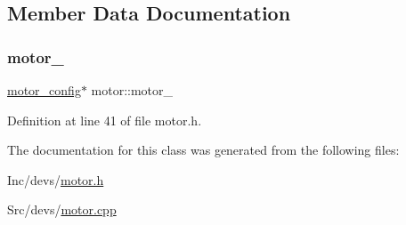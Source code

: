 \subsection{Member Data Documentation}
\mbox{\label{classmotor_ab02539b935506b27e47fe9ae15213ea7}} 
\subsubsection{\texorpdfstring{motor\_}{motor\_}}
{\footnotesize\ttfamily \mbox{\hyperlink{structmotor__config}{motor\+\_\+config}}$\ast$ motor\+::motor\+\_\+\hspace{0.3cm}{\ttfamily [private]}}



Definition at line 41 of file motor.\+h.



The documentation for this class was generated from the following files\+:\begin{DoxyCompactItemize}
\item 
Inc/devs/\mbox{\hyperlink{motor_8h}{motor.\+h}}\item 
Src/devs/\mbox{\hyperlink{motor_8cpp}{motor.\+cpp}}\end{DoxyCompactItemize}
